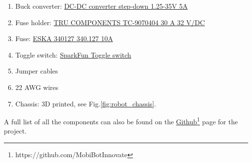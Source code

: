 \begin{enumerate}
    \item Buck converter: \href{https://www.electrokit.com/en/dc-dc-omvandlare-step-down-1.25-35v-5a}{DC-DC converter step-down 1.25-35V 5A}
    \item Fuse holder: \href{https://www.conrad.se/sv/p/tru-components-tc-9070404-sakringsinsats-passar-till-flatsakring-standard-30-a-32-v-dc-1-st-2267601.html}{TRU COMPONENTS TC-9070404 30 A 32 V/DC}
    \item Fuse: \href{https://www.conrad.se/sv/p/eska-340127-340-127-standardflatsakring-10-a-rod-1-st-535104.html}{ESKA 340127 340.127 10A}
    \item Toggle switch: \href{https://www.electrokit.com/en/vippomkopplare-med-skylt-1-pol-on-off}{SparkFun Toggle switch}
    \item Jumper cables
    \item 22 AWG wires
    \item Chassis: 3D printed, see Fig.\:\ref{fig:robot_chassis}.
\end{enumerate}
A full list of all the components can also be found on the \href{https://github.com/MobiBotInnovate}{Github}\footnote{https://github.com/MobiBotInnovate\label{foot1}} page for the project.


